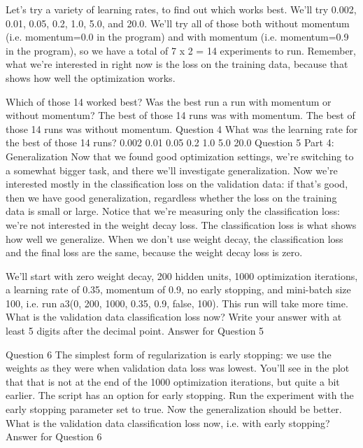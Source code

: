 Let's try a variety of learning rates, to find out which works best. We'll try 0.002, 0.01, 0.05, 0.2, 1.0, 5.0, and 20.0. We'll try all of those both without momentum (i.e. momentum=0.0 in the program) and with momentum (i.e. momentum=0.9 in the program), so we have a total of 7 x 2 = 14 experiments to run. Remember, what we're interested in right now is the loss on the training data, because that shows how well the optimization works.

Which of those 14 worked best?
Was the best run a run with momentum or without momentum?
The best of those 14 runs was with momentum.
The best of those 14 runs was without momentum.
Question 4
What was the learning rate for the best of those 14 runs?
0.002
0.01
0.05
0.2
1.0
5.0
20.0
Question 5
Part 4: Generalization
Now that we found good optimization settings, we're switching to a somewhat bigger task, and there we'll investigate generalization. Now we're interested mostly in the classification loss on the validation data: if that's good, then we have good generalization, regardless whether the loss on the training data is small or large. Notice that we're measuring only the classification loss: we're not interested in the weight decay loss. The classification loss is what shows how well we generalize. When we don't use weight decay, the classification loss and the final loss are the same, because the weight decay loss is zero. 

We'll start with zero weight decay, 200 hidden units, 1000 optimization iterations, a learning rate of 0.35, momentum of 0.9, no early stopping, and mini-batch size 100, i.e. run a3(0, 200, 1000, 0.35, 0.9, false, 100). This run will take more time.
What is the validation data classification loss now? Write your answer with at least 5 digits after the decimal point.
Answer for Question 5

Question 6
The simplest form of regularization is early stopping: we use the weights as they were when validation data loss was lowest. You'll see in the plot that that is not at the end of the 1000 optimization iterations, but quite a bit earlier. The script has an option for early stopping. Run the experiment with the early stopping parameter set to true. Now the generalization should be better.
What is the validation data classification loss now, i.e. with early stopping?
Answer for Question 6

